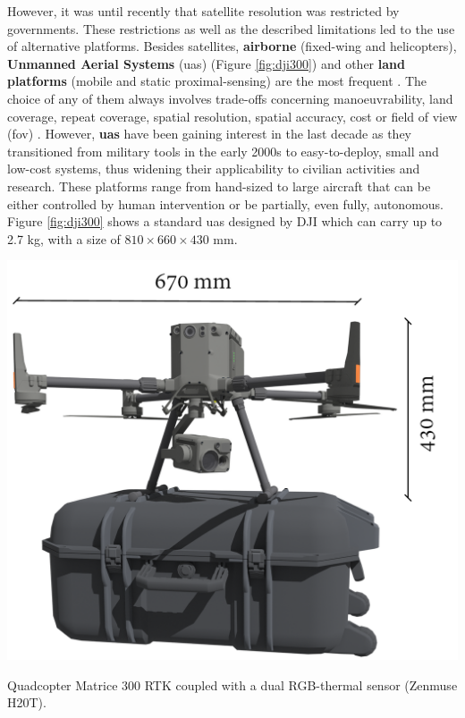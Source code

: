 However, it was until recently that satellite resolution was restricted by governments. These restrictions as well as the described limitations led to the use of alternative platforms. Besides satellites, \textbf{airborne} (fixed-wing and helicopters), \textbf{Unmanned Aerial Systems} (\acrshort{uas}) (Figure \ref{fig:dji300}) and other \textbf{land platforms} (mobile and static proximal-sensing) are the most frequent \cite{lillesand_remote_2015}. The choice of any of them always involves trade-offs concerning manoeuvrability, land coverage, repeat coverage, spatial resolution, spatial accuracy, cost or field of view (\acrshort{fov}) \cite{toth_remote_2016}. However, \textbf{\acrshort{uas}} have been gaining interest in the last decade as they transitioned from military tools in the early 2000s to easy-to-deploy, small and low-cost systems, thus widening their applicability to civilian activities and research. These platforms range from hand-sized to large aircraft that can be either controlled by human intervention or be partially, even fully, autonomous. Figure \ref{fig:dji300} shows a standard \acrshort{uas} designed by DJI which can carry up to 2.7 \si{\kilo\gram}, with a size of $810 \times 660 \times 430$ \si{\milli\meter}.
\begin{marginfigure}[-3cm]
	\includegraphics{figs/introduction/dji300.png}
	\caption{Quadcopter Matrice 300 RTK coupled with a dual RGB-thermal sensor (Zenmuse H20T). }
	\label{fig:dji300}
\end{marginfigure}


